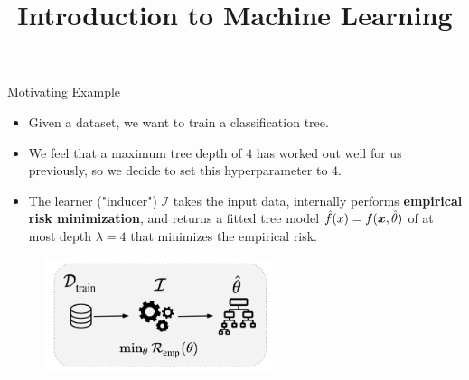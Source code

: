 \documentclass[11pt,compress,t,notes=noshow, xcolor=table]{beamer}
\title{Introduction to Machine Learning}
\institute{\href{https://compstat-lmu.github.io/lecture_i2ml/}{compstat-lmu.github.io/lecture\_i2ml}}
\date{}
\begin{document}













\sloppy

\begin{vbframe}{Motivating Example} 

\begin{itemize}
\item Given a dataset, we want to train a classification tree. 
\item We feel that a maximum tree depth of $4$ has worked out well for us previously, so we decide to set this hyperparameter to $4$. 
\item The learner ("inducer") $\mathcal{I}$ takes the input data, internally performs \textbf{empirical risk minimization}, and returns a fitted tree model $\hat{f}(x) = f(\bm{x}, \hat{\theta})$ of at most depth $\lambda = 4$ that minimizes the empirical risk.
\end{itemize}

\begin{center}
\begin{figure}
\includegraphics[width=0.6\textwidth]{figure_man/riskmin_bilevel1.png}
\end{figure}
\end{center}

\framebreak 


\end{vbframe}
\end{document}
